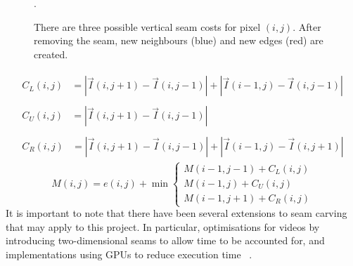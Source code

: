 \begin{figure}[htp]
    \scalebox{0.78}{}
    \caption[Potential Seam Costs]{There are three possible vertical seam costs for pixel $(i, j)$. After removing the seam, new neighbours (blue) and new edges (red) are created.}. 
    \label{fig:adjacency}
\end{figure}
\begin{align}
    \label{eq:adjacency}
    \begin{split}
        C_L(i, j) &= |\vec{I}(i, j+1) - \vec{I}(i, j-1)| + |\vec{I}(i-1, j) - \vec{I}(i, j-1)|
    \end{split} \\
    \begin{split}
        C_U(i, j) &= |\vec{I}(i, j+1) - \vec{I}(i, j-1)|
    \end{split} \\
    \begin{split}
        C_R(i, j) &= |\vec{I}(i, j+1) - \vec{I}(i, j-1)| + |\vec{I}(i-1, j) - \vec{I}(i, j+1)|
    \end{split}
\end{align}
\begin{equation}
    \label{eq:forwardEnergy}
    M(i, j) = e(i, j) + \min 
    \begin{cases}
        M(i-1, j-1) + C_L(i,j) \\
        M(i-1, j) + C_U(i,j) \\
        M(i-1, j+1) + C_R(i,j)
    \end{cases}
\end{equation}
\indent
It is important to note that there have been several extensions to seam carving that may apply to this project. In particular, optimisations for videos by introducing two-dimensional seams to allow time to be accounted for, and implementations using GPUs to reduce execution time ~\cite{Rubinstein, Duarte}.


